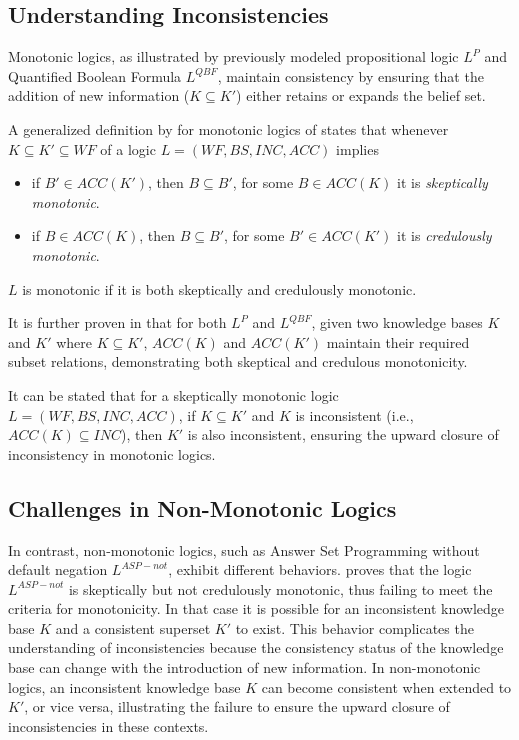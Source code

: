 \subsection{Understanding Inconsistencies}
Monotonic logics, as illustrated by previously modeled propositional logic \(L^P\) and Quantified Boolean Formula \(L^{QBF}\), maintain consistency by ensuring that the addition of new information (\(K \subseteq K'\)) either retains or expands the belief set.

A generalized definition by \cite{brewka_strong_2019} for monotonic logics of \cite{brewka_equilibria_2007} states that whenever \(K \subseteq K' \subseteq WF\) of a logic \(L = (WF, BS, INC, ACC)\) implies
\begin{itemize}
      \item if \(B' \in ACC(K')\), then \(B \subseteq B'\), for some \(B \in ACC(K)\) it is \textit{skeptically monotonic}.
      \item if \(B \in ACC(K)\), then \(B \subseteq B'\), for some \(B' \in ACC(K')\) it is \textit{credulously monotonic}.
\end{itemize}
\(L\) is monotonic if it is both skeptically and credulously monotonic.

It is further proven in \cite{brewka_strong_2019} that for both \(L^P\) and \(L^{QBF}\), given two knowledge bases \(K\) and \(K'\) where \(K \subseteq K'\), \(ACC(K)\) and \(ACC(K')\) maintain their required subset relations, demonstrating both skeptical and credulous monotonicity.

It can be stated that for a skeptically monotonic logic \(L=(WF, BS, INC, ACC)\), if \(K \subseteq K'\) and \(K\) is inconsistent (i.e., \(ACC(K) \subseteq INC\)), then \(K'\) is also inconsistent, ensuring the upward closure of inconsistency in monotonic logics.

\subsection{Challenges in Non-Monotonic Logics}
In contrast, non-monotonic logics, such as Answer Set Programming without default negation \(L^{ASP-not}\), exhibit different behaviors.
\cite{brewka_strong_2019} proves that the logic \(L^{ASP-not}\) is skeptically but not credulously monotonic, thus failing to meet the criteria for monotonicity.
In that case it is possible for an inconsistent knowledge base \(K\) and a consistent superset \(K'\) to exist.
This behavior complicates the understanding of inconsistencies because the consistency status of the knowledge base can change with the introduction of new information.
In non-monotonic logics, an inconsistent knowledge base \(K\) can become consistent when extended to \(K'\), or vice versa, illustrating the failure to ensure the upward closure of inconsistencies in these contexts.

